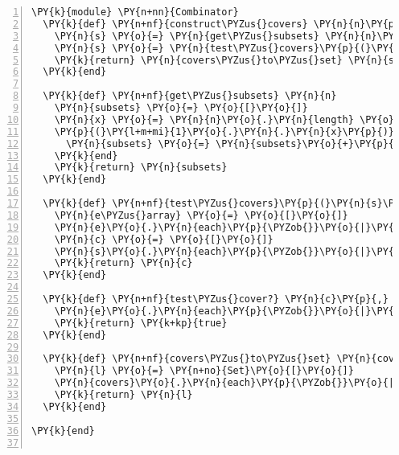 \begin{Verbatim}[commandchars=\\\{\},numbers=left,firstnumber=1,stepnumber=1,xleftmargin=7mm, fontsize=\small]
\PY{k}{module} \PY{n+nn}{Combinator}
  \PY{k}{def} \PY{n+nf}{construct\PYZus{}covers} \PY{n}{n}\PY{p}{,} \PY{n}{e}
    \PY{n}{s} \PY{o}{=} \PY{n}{get\PYZus{}subsets} \PY{n}{n}\PY{o}{.}\PY{n}{collect}\PY{p}{\PYZob{}}\PY{o}{|}\PY{n}{k}\PY{o}{|} \PY{n}{k}\PY{o}{.}\PY{n}{id}\PY{p}{\PYZcb{}}
    \PY{n}{s} \PY{o}{=} \PY{n}{test\PYZus{}covers}\PY{p}{(}\PY{n}{s}\PY{p}{,}\PY{n}{e}\PY{p}{)}
    \PY{k}{return} \PY{n}{covers\PYZus{}to\PYZus{}set} \PY{n}{s}
  \PY{k}{end}

  \PY{k}{def} \PY{n+nf}{get\PYZus{}subsets} \PY{n}{n}
    \PY{n}{subsets} \PY{o}{=} \PY{o}{[}\PY{o}{]}
    \PY{n}{x} \PY{o}{=} \PY{n}{n}\PY{o}{.}\PY{n}{length} \PY{o}{-} \PY{l+m+mi}{1}
    \PY{p}{(}\PY{l+m+mi}{1}\PY{o}{.}\PY{n}{.}\PY{n}{x}\PY{p}{)}\PY{o}{.}\PY{n}{each} \PY{k}{do} \PY{o}{|}\PY{n}{k}\PY{o}{|}
      \PY{n}{subsets} \PY{o}{=} \PY{n}{subsets}\PY{o}{+}\PY{p}{(}\PY{n}{n}\PY{o}{.}\PY{n}{combination}\PY{p}{(}\PY{n}{k}\PY{p}{)}\PY{o}{.}\PY{n}{to\PYZus{}a}\PY{p}{)}
    \PY{k}{end}
    \PY{k}{return} \PY{n}{subsets}
  \PY{k}{end}

  \PY{k}{def} \PY{n+nf}{test\PYZus{}covers}\PY{p}{(}\PY{n}{s}\PY{p}{,} \PY{n}{e}\PY{p}{)}
    \PY{n}{e\PYZus{}array} \PY{o}{=} \PY{o}{[}\PY{o}{]}
    \PY{n}{e}\PY{o}{.}\PY{n}{each}\PY{p}{\PYZob{}}\PY{o}{|}\PY{n}{k}\PY{o}{|} \PY{n}{e\PYZus{}array}\PY{o}{.}\PY{n}{push}\PY{p}{(}\PY{n}{k}\PY{o}{.}\PY{n}{to\PYZus{}a}\PY{p}{)}\PY{p}{\PYZcb{}}
    \PY{n}{c} \PY{o}{=} \PY{o}{[}\PY{o}{]}
    \PY{n}{s}\PY{o}{.}\PY{n}{each}\PY{p}{\PYZob{}}\PY{o}{|}\PY{n}{k}\PY{o}{|} \PY{n}{c}\PY{o}{.}\PY{n}{push}\PY{p}{(}\PY{n}{k}\PY{p}{)} \PY{k}{if} \PY{n}{test\PYZus{}cover?}\PY{p}{(}\PY{n}{k}\PY{p}{,}\PY{n}{e\PYZus{}array}\PY{p}{)}\PY{p}{\PYZcb{}}
    \PY{k}{return} \PY{n}{c}
  \PY{k}{end}

  \PY{k}{def} \PY{n+nf}{test\PYZus{}cover?} \PY{n}{c}\PY{p}{,} \PY{n}{e}
    \PY{n}{e}\PY{o}{.}\PY{n}{each}\PY{p}{\PYZob{}}\PY{o}{|}\PY{n}{k}\PY{o}{|} \PY{k}{return} \PY{k+kp}{false} \PY{k}{if} \PY{p}{(}\PY{n}{c}\PY{o}{&}\PY{n}{k}\PY{p}{)}\PY{o}{.}\PY{n}{empty?}\PY{p}{\PYZcb{}}
    \PY{k}{return} \PY{k+kp}{true}
  \PY{k}{end}    

  \PY{k}{def} \PY{n+nf}{covers\PYZus{}to\PYZus{}set} \PY{n}{covers}
    \PY{n}{l} \PY{o}{=} \PY{n+no}{Set}\PY{o}{[}\PY{o}{]}
    \PY{n}{covers}\PY{o}{.}\PY{n}{each}\PY{p}{\PYZob{}}\PY{o}{|}\PY{n}{k}\PY{o}{|} \PY{n}{l}\PY{o}{.}\PY{n}{add}\PY{p}{(}\PY{n+no}{Set}\PY{o}{.}\PY{n}{new}\PY{p}{(}\PY{n}{k}\PY{p}{)}\PY{p}{)}\PY{p}{\PYZcb{}}
    \PY{k}{return} \PY{n}{l}
  \PY{k}{end}

\PY{k}{end}


\end{Verbatim}
